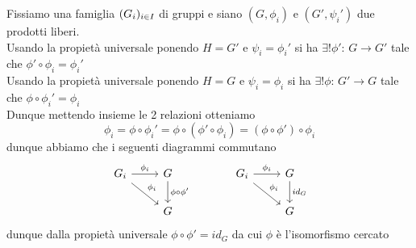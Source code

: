 \begin{prop}\bianco
\proof Fissiamo una famiglia $\displaystyle (G_i)_{i\in I}$ di gruppi e siano $(G,\phi_i)$ e $(G', \psi_i')$ due prodotti liberi.\\
Usando la propiet\`a universale ponendo $H=G'$ e $\psi_i=\phi_i'$ si ha $\exists ! \phi':\, G \to G'$ tale che $\phi'\circ \phi_i =\phi_i'$\\
Usando la propiet\`a universale ponendo $H=G$ e $\psi_i=\phi_i$ si ha $\exists ! \phi:\, G' \to G$ tale che $\phi\circ \phi_i' =\phi_i$\\
Dunque mettendo insieme le 2 relazioni otteniamo $$\phi_i=\phi\circ \phi_i' = \phi \circ \left( \phi' \circ \phi_i \right)=\left( \phi \circ \phi' \right)\circ \phi_i$$
dunque abbiamo che i seguenti diagrammi commutano
$$\begin{tikzcd} G_i \arrow{rd}{\phi_i} \arrow{r}{\phi_i} & G \arrow{d}{\phi\circ \phi'} & &G_i \arrow{rd}{\phi_i} \arrow{r}{\phi_i} & G \arrow{d}{id_G } 
\\
 &G & & & G
\end{tikzcd}$$
dunque dalla propiet\`a universale $\phi \circ \phi'=id_G$ da cui $\phi$ \`e l'isomorfismo cercato 
\endproof
\end{prop}
\spazio

